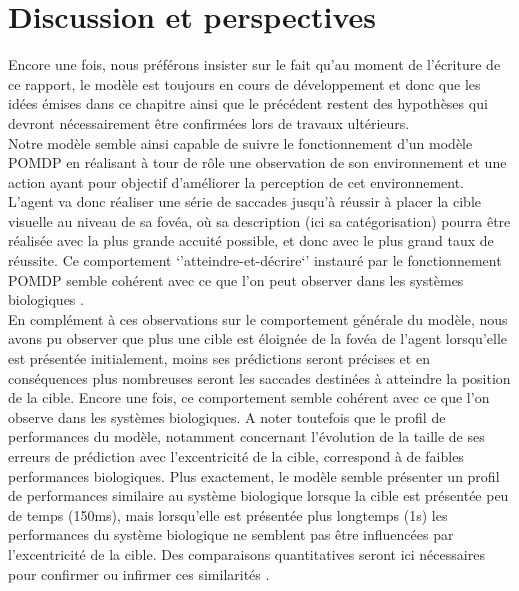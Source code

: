 
\chapter{Discussion et perspectives} %

\label{Discussion} %

Encore une fois, nous préférons insister sur le fait qu'au moment de l'écriture de ce rapport, le modèle est toujours en cours de développement et donc que les idées émises dans ce chapitre ainsi que le précédent restent des hypothèses qui devront nécessairement être confirmées lors de travaux ultérieurs.\\

Notre modèle semble ainsi capable de suivre le fonctionnement d'un modèle POMDP en réalisant à tour de rôle une observation de son environnement et une action ayant pour objectif d'améliorer la perception de cet environnement. \\
L'agent va donc réaliser une série de saccades jusqu'à réussir à placer la cible visuelle au niveau de sa fovéa, où sa description (ici sa catégorisation) pourra être réalisée avec la plus grande accuité possible, et donc avec le plus grand taux de réussite. Ce comportement `'atteindre-et-décrire`' instauré par le fonctionnement POMDP semble cohérent avec ce que l'on peut observer dans les systèmes biologiques \autocite{Werner2014, Najemnik2005}. \\
En complément à ces observations sur le comportement générale du modèle, nous avons pu observer que plus une cible est éloignée de la fovéa de l'agent lorsqu'elle est présentée initialement, moins ses prédictions seront précises et en conséquences plus nombreuses seront les saccades destinées à atteindre la position de la cible. 
Encore une fois, ce comportement semble cohérent avec ce que l'on observe dans les systèmes biologiques. 
A noter toutefois que le profil de performances du modèle, notamment concernant l'évolution de la taille de ses erreurs de prédiction avec l'excentricité de la cible, correspond à de faibles performances biologiques. 
Plus exactement, le modèle semble présenter un profil de performances similaire au système biologique lorsque la cible est présentée peu de temps (150ms), mais lorsqu'elle est présentée plus longtemps (1s) les performances du système biologique ne semblent pas être influencées par l'excentricité de la cible. Des comparaisons quantitatives seront ici nécessaires pour confirmer ou infirmer ces similarités \autocite{Uddin2004}.\\

